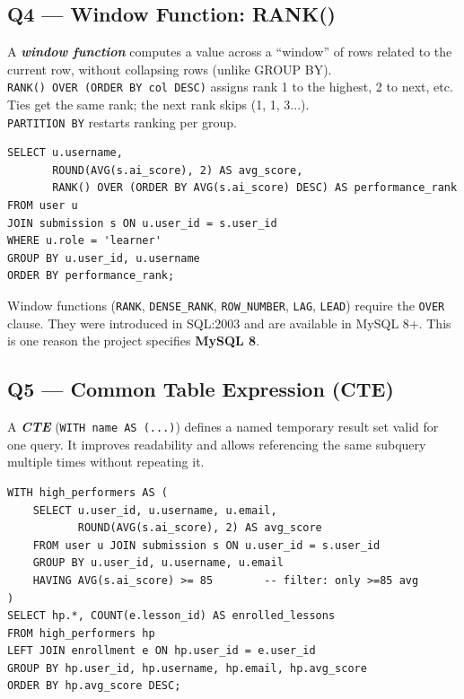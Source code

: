 \documentclass[11pt,a4paper]{article}
\newcommand{\term}[1]{\textbf{\textit{#1}}}
\newcommand{\T}[1]{\texttt{#1}}          %
\begin{document}
\subsection{Q4 — Window Function: RANK()}

\begin{defbox}
A \term{window function} computes a value across a ``window'' of rows related to the
current row, without collapsing rows (unlike GROUP BY).\\[4pt]
\T{RANK() OVER (ORDER BY col DESC)} assigns rank 1 to the highest, 2 to next, etc.
Ties get the same rank; the next rank skips (1, 1, 3...).\\
\T{PARTITION BY} restarts ranking per group.
\end{defbox}

\begin{lstlisting}[style=sql]
SELECT u.username,
       ROUND(AVG(s.ai_score), 2) AS avg_score,
       RANK() OVER (ORDER BY AVG(s.ai_score) DESC) AS performance_rank
FROM user u
JOIN submission s ON u.user_id = s.user_id
WHERE u.role = 'learner'
GROUP BY u.user_id, u.username
ORDER BY performance_rank;
\end{lstlisting}

\begin{keybox}
Window functions (\T{RANK}, \T{DENSE\_RANK}, \T{ROW\_NUMBER}, \T{LAG}, \T{LEAD})
require the \T{OVER} clause. They were introduced in SQL:2003 and are available in
MySQL 8+. This is one reason the project specifies \textbf{MySQL 8}.
\end{keybox}

\subsection{Q5 — Common Table Expression (CTE)}

\begin{defbox}
A \term{CTE} (\T{WITH name AS (...)}) defines a named temporary result set valid for
one query. It improves readability and allows referencing the same subquery multiple
times without repeating it.
\end{defbox}

\begin{lstlisting}[style=sql]
WITH high_performers AS (
    SELECT u.user_id, u.username, u.email,
           ROUND(AVG(s.ai_score), 2) AS avg_score
    FROM user u JOIN submission s ON u.user_id = s.user_id
    GROUP BY u.user_id, u.username, u.email
    HAVING AVG(s.ai_score) >= 85        -- filter: only >=85 avg
)
SELECT hp.*, COUNT(e.lesson_id) AS enrolled_lessons
FROM high_performers hp
LEFT JOIN enrollment e ON hp.user_id = e.user_id
GROUP BY hp.user_id, hp.username, hp.email, hp.avg_score
ORDER BY hp.avg_score DESC;
\end{lstlisting}
\end{document}
